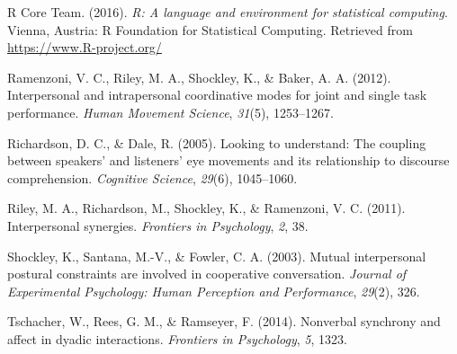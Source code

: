 \documentclass[10pt, letterpaper]{article}
\begin{document}
\hypertarget{ref-r2016r}{}
R Core Team. (2016). \emph{R: A language and environment for statistical
computing}. Vienna, Austria: R Foundation for Statistical Computing.
Retrieved from \url{https://www.R-project.org/}

\hypertarget{ref-ramenzoni2012interpersonal}{}
Ramenzoni, V. C., Riley, M. A., Shockley, K., \& Baker, A. A. (2012).
Interpersonal and intrapersonal coordinative modes for joint and single
task performance. \emph{Human Movement Science}, \emph{31}(5),
1253--1267.

\hypertarget{ref-richardson2005looking}{}
Richardson, D. C., \& Dale, R. (2005). Looking to understand: The
coupling between speakers' and listeners' eye movements and its
relationship to discourse comprehension. \emph{Cognitive Science},
\emph{29}(6), 1045--1060.

\hypertarget{ref-riley2011interpersonal}{}
Riley, M. A., Richardson, M., Shockley, K., \& Ramenzoni, V. C. (2011).
Interpersonal synergies. \emph{Frontiers in Psychology}, \emph{2}, 38.

\hypertarget{ref-shockley2003mutual}{}
Shockley, K., Santana, M.-V., \& Fowler, C. A. (2003). Mutual
interpersonal postural constraints are involved in cooperative
conversation. \emph{Journal of Experimental Psychology: Human Perception
and Performance}, \emph{29}(2), 326.

\hypertarget{ref-tschacher2014nonverbal}{}
Tschacher, W., Rees, G. M., \& Ramseyer, F. (2014). Nonverbal synchrony
and affect in dyadic interactions. \emph{Frontiers in Psychology},
\emph{5}, 1323.
\end{document}
